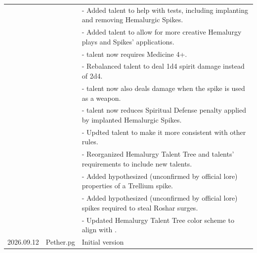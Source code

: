 \begin{tabular}{p{2cm} p{2cm} p{12cm}}
	&& - Added \talentHemalurgyMedicineName{} talent to help with \skillMedicine{} tests, including implanting and removing Hemalurgic Spikes. \\
	
	&& - Added \talentSinisterIntentName{} talent to allow for more creative Hemalurgy plays and Spikes' applications. \\
	
	&& - \talentSpikeDdeathlessName{} talent now requires Medicine 4+. \\
	
	&& - Rebalanced \talentSpikeRuinousName{}  talent to deal 1d4 spirit damage instead of 2d4. \\
	
	&& - \talentSpikeRuinousName{} talent now also deals damage when the spike is used as a weapon. \\
	
	&& - \talentCreateLinchpinName{} talent now reduces Spiritual Defense penalty applied by implanted Hemalurgic Spikes. \\
	
	&& - Updted \talentStealTraceName{} talent to make it more consistent with other \cosmereRPG{} rules. \\
	
	&& - Reorganized Hemalurgy Talent Tree and talents' requirements to include new talents. \\
	
	&& - Added hypothesized (unconfirmed by official lore) properties of a Trellium spike. \\
	
	&& - Added hypothesized (unconfirmed by official lore) spikes required to steal Roshar surges. \\	
	
	&& - Updated Hemalurgy Talent Tree color scheme to align with \handbookMistborn{}. \\
	
	
	\hline	
	
	\color{black} 2026.09.12
	& \color{black} Pether.pg
	& \color{black} Initial version \\	
	\hline	
	
\end{tabular}

\twocolumn

